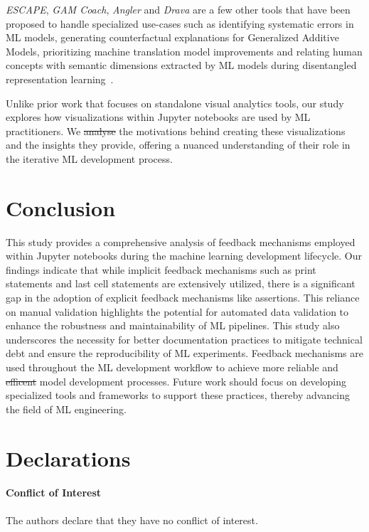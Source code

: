 \documentclass[smallextended]{svjour3}       %
\providecommand{\DIFadd}[1]{{\protect\color{blue}\uwave{#1}}} %
\providecommand{\DIFdel}[1]{{\protect\color{red}\sout{#1}}} %
\providecommand{\DIFaddbegin}{} %
\providecommand{\DIFaddend}{} %
\providecommand{\DIFdelbegin}{} %
\providecommand{\DIFdelend}{} %
\newcommand{\DIFscaledelfig}{0.5}
\newlength{\DIFdelgraphicswidth} %
\newlength{\DIFdelgraphicsheight} %
\newcommand{\DIFaddincludegraphics}[2][]{{\color{blue}\fbox{\DIFOincludegraphics[#1]{#2}}}} %
\newcommand{\DIFdelincludegraphics}[2][]{%
\sbox{\DIFdelgraphicsbox}{\DIFOincludegraphics[#1]{#2}}%
\settoboxwidth{\DIFdelgraphicswidth}{\DIFdelgraphicsbox} %
\settoboxtotalheight{\DIFdelgraphicsheight}{\DIFdelgraphicsbox} %
\scalebox{\DIFscaledelfig}{%
\parbox[b]{\DIFdelgraphicswidth}{\usebox{\DIFdelgraphicsbox}\\[-\baselineskip] \rule{\DIFdelgraphicswidth}{0em}}\llap{\resizebox{\DIFdelgraphicswidth}{\DIFdelgraphicsheight}{%
\setlength{\unitlength}{\DIFdelgraphicswidth}%
\begin{picture}(1,1)%
\thicklines\linethickness{2pt} %
{\color[rgb]{1,0,0}\put(0,0){\framebox(1,1){}}}%
{\color[rgb]{1,0,0}\put(0,0){\line( 1,1){1}}}%
{\color[rgb]{1,0,0}\put(0,1){\line(1,-1){1}}}%
\end{picture}%
}\hspace*{3pt}}} %
} %
\DeclareRobustCommand{\DIFaddbegin}{\DIFOaddbegin \let\includegraphics\DIFaddincludegraphics} %
\DeclareRobustCommand{\DIFaddend}{\DIFOaddend \let\includegraphics\DIFOincludegraphics} %
\DeclareRobustCommand{\DIFdelbegin}{\DIFOdelbegin \let\includegraphics\DIFdelincludegraphics} %
\DeclareRobustCommand{\DIFdelend}{\DIFOaddend \let\includegraphics\DIFOincludegraphics} %
\begin{document}
\textit{ESCAPE}, \textit{GAM Coach}, \textit{Angler} and \textit{Drava} are a few other tools that have been proposed to handle specialized use-cases such as identifying systematic errors in ML models, generating counterfactual explanations for Generalized Additive Models, prioritizing machine translation model improvements and relating human concepts with semantic dimensions extracted by ML models during disentangled representation learning~\citep{ahn2023escape,wang2023gam,robertson2023angler,wang2023drava}.

Unlike prior work that focuses on standalone visual analytics tools, our study explores how visualizations within Jupyter notebooks are used by ML practitioners. We \DIFdelbegin \DIFdel{analyse }\DIFdelend \DIFaddbegin \DIFadd{analyze }\DIFaddend the motivations behind creating these visualizations and the insights they provide, offering a nuanced understanding of their role in the iterative ML development process.

\section{Conclusion}

This study provides a comprehensive analysis of feedback mechanisms employed within Jupyter notebooks during the machine learning development lifecycle. Our findings indicate that while implicit feedback mechanisms such as print statements and last cell statements are extensively utilized, there is a significant gap in the adoption of explicit feedback mechanisms like assertions. This reliance on manual validation highlights the potential for automated data validation to enhance the robustness and maintainability of ML pipelines. This study also underscores the necessity for better documentation practices to mitigate technical debt and ensure the reproducibility of ML experiments. Feedback mechanisms are used throughout the ML development workflow to achieve more reliable and \DIFdelbegin \DIFdel{efficent }\DIFdelend \DIFaddbegin \DIFadd{efficient }\DIFaddend model development processes. Future work should focus on developing specialized tools and frameworks to support these practices, thereby advancing the field of ML engineering.

\section{Declarations}

\paragraph{\textbf{Conflict of Interest}} The authors declare that they have no conflict of interest.
\end{document}
